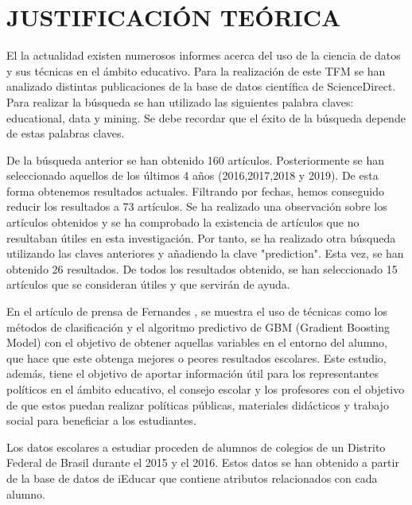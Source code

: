 \documentclass[spanish,12pt, a4paper,twoside]{paper}
\let\oldsection\section
\def\section{\cleardoublepage\oldsection}
\begin{document}
\section{JUSTIFICACIÓN TEÓRICA}
\justify
El la actualidad existen numerosos informes acerca del uso de la ciencia de datos y sus técnicas en el ámbito educativo. Para la realización de este TFM se han analizado distintas publicaciones de la base de datos científica de ScienceDirect. Para realizar la búsqueda se han utilizado las siguientes palabra claves: educational, data y mining. Se debe recordar que el éxito de la búsqueda depende de estas palabras claves.

\justify
De la búsqueda anterior se han obtenido 160 artículos. Posteriormente se han seleccionado aquellos de los últimos 4 años (2016,2017,2018 y 2019). De esta forma obtenemos resultados actuales. Filtrando por fechas, hemos conseguido reducir los resultados a 73 artículos. Se ha realizado una observación sobre los artículos obtenidos y se ha comprobado la existencia de artículos que no resultaban útiles en esta investigación. Por tanto, se ha realizado otra búsqueda utilizando las claves anteriores y añadiendo la clave "prediction". Esta vez, se han obtenido 26 resultados. De todos los resultados obtenido, se han seleccionado 15 artículos que se consideran útiles y que servirán de ayuda.

\justify
En el artículo de prensa de Fernandes \cite{Fernandes2018}, se muestra el uso de técnicas como los métodos de clasificación y el algoritmo predictivo de GBM (Gradient Boosting Model) con el objetivo de obtener aquellas variables en el entorno del alumno, que hace que este obtenga mejores o peores resultados escolares. Este estudio, además, tiene el objetivo de aportar información útil para los representantes políticos en el ámbito educativo, el consejo escolar y los profesores con el objetivo de que estos puedan realizar políticas públicas, materiales didácticos y trabajo social para beneficiar a los estudiantes.

\justify
Los datos escolares a estudiar proceden de alumnos de colegios de un Distrito Federal de Brasil durante el 2015 y el 2016. Estos datos se han obtenido a partir de la base de datos de iEducar que contiene atributos relacionados con cada alumno. 
\end{document}
